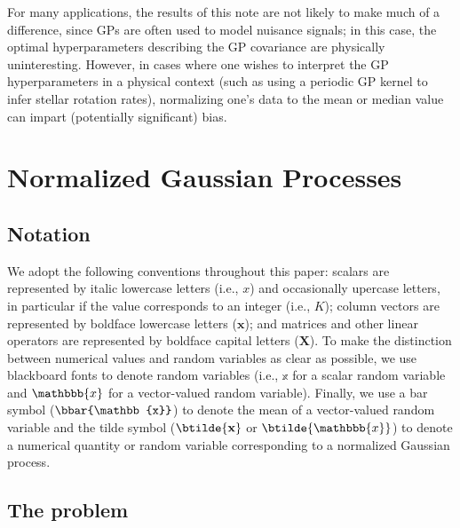 \documentclass[modern]{aastex62}
\begin{document}
For many applications, the results of this note are not likely to make
much of a difference, since GPs are often used to model nuisance
signals; in this case, the optimal hyperparameters describing the GP
covariance are physically uninteresting. However, in cases where one
wishes to interpret the GP hyperparameters in a physical context
(such as using a periodic GP kernel to infer stellar rotation rates),
normalizing one's data to the mean or median value can impart
(potentially significant) bias.

\section{Normalized Gaussian Processes}
\label{sec:main}

\subsection{Notation}
\label{sec:notation}

We adopt
the following conventions throughout this paper:
scalars are represented by italic lowercase letters (i.e., $x$)
and occasionally upercase letters, in particular if the value
corresponds to an integer (i.e., $K$);
column vectors are
represented by boldface lowercase letters
($\mathbf{x}$); and matrices and other linear operators are represented
by boldface capital letters ($\mathbf{X}$).
To make the distinction between numerical values and random variables as
clear as possible, we use blackboard fonts to denote random variables
(i.e., $\mathbb{x}$ for a scalar random variable and $\mathbbb{x}$
for a vector-valued random variable).
Finally, we use a bar symbol
($\bbar{\mathbb{x}}$) to denote the mean of a vector-valued random
variable and the tilde symbol
($\btilde{\mathbf{x}}$ or $\btilde{\mathbbb{x}}$) to denote a numerical
quantity or random variable corresponding
to a normalized Gaussian process.

%

\subsection{The problem}
\label{sec:problem}
\end{document}
